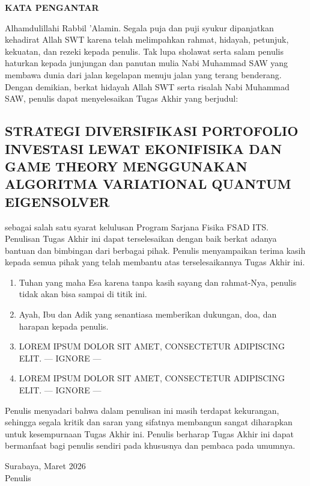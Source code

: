 \begin{center}
	\large{\textbf{KATA PENGANTAR}}
\end{center}
\indent Alhamdulillahi Rabbil 'Alamin. Segala puja dan puji syukur dipanjatkan kehadirat Allah SWT karena telah melimpahkan rahmat, hidayah, petunjuk, kekuatan, dan rezeki kepada penulis. Tak lupa sholawat serta salam penulis haturkan kepada junjungan dan panutan mulia Nabi Muhammad SAW yang membawa dunia dari jalan kegelapan menuju jalan yang terang benderang. Dengan demikian, berkat hidayah Allah SWT serta risalah Nabi Muhammad SAW, penulis dapat menyelesaikan Tugas Akhir yang berjudul:
\begin{center}
	\section*{STRATEGI DIVERSIFIKASI PORTOFOLIO INVESTASI LEWAT EKONIFISIKA DAN GAME THEORY MENGGUNAKAN ALGORITMA VARIATIONAL QUANTUM EIGENSOLVER}
\end{center}
sebagai salah satu syarat kelulusan Program Sarjana Fisika FSAD ITS.\\
\indent Penulisan Tugas Akhir ini dapat terselesaikan dengan baik berkat adanya bantuan dan bimbingan dari berbagai pihak. Penulis menyampaikan terima kasih kepada semua pihak yang telah membantu atas terselesaikannya Tugas Akhir ini.
\begin{enumerate}
    \item Tuhan yang maha Esa karena tanpa kasih sayang dan rahmat-Nya, penulis tidak akan bisa sampai di titik ini.
    \item Ayah, Ibu dan Adik yang senantiasa memberikan dukungan, doa, dan harapan kepada penulis.
    \item LOREM IPSUM DOLOR SIT AMET, CONSECTETUR ADIPISCING ELIT. --- IGNORE ---
    \item LOREM IPSUM DOLOR SIT AMET, CONSECTETUR ADIPISCING ELIT. --- IGNORE ---
\end{enumerate}
Penulis menyadari bahwa dalam penulisan ini masih terdapat kekurangan, sehingga segala kritik dan saran yang sifatnya membangun sangat diharapkan untuk kesempurnaan Tugas Akhir ini. Penulis berharap  Tugas Akhir ini dapat bermanfaat bagi penulis sendiri pada khususnya dan pembaca pada umumnya.

\begin{flushright}
	Surabaya, Maret 2026\\
	\vspace{2cm}
	Penulis
\end{flushright}